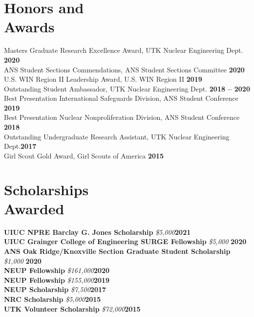 \documentclass[margin,line]{resume}
\begin{document}
\begin{resume}
    \section{\mysidestyle Honors and\\Awards}
                Masters Graduate Research Excellence Award, UTK Nuclear Engineering Dept. \hfill \textbf{2020}\vspace{.5mm}\\%
                ANS Student Sections Commendations, ANS Student Sections Committee \hfill \textbf{2020}\vspace{.5mm}\\%
                U.S. WIN Region II Leadership Award, U.S. WIN Region II \hfill \textbf{2019}\vspace{.5mm}\\%
                Outstanding Student Ambassador, UTK Nuclear Engineering Dept. \hfill \textbf{2018 -- 2020}\vspace{.5mm}\\%
                Best Presentation International Safeguards Division, ANS Student Conference \hfill \textbf{2019}\vspace{0.5mm}\\%
                Best Presentation Nuclear Nonproliferation Division, ANS Student Conference \hfill \textbf{2018}\vspace{0.5mm}\\%
                Outstanding Undergraduate Research Assistant, UTK Nuclear Engineering Dept.\hfill \textbf{2017}\vspace{.5mm}\\%
                Girl Scout Gold Award, Girl Scouts of America \hfill \textbf{2015}\vspace{.5mm}\\%

    \section{\mysidestyle Scholarships\\Awarded}
    \textbf{UIUC NPRE Barclay G. Jones Scholarship} \textsl{\$5,000}\hfill \textbf{2021}\\
    \textbf{UIUC Grainger College of Engineering SURGE Fellowship} \textsl{\$5,000} \hfill \textbf{2020}\\
    \textbf{ANS Oak Ridge/Knoxville Section Graduate Student Scholarship} \textsl{\$1,000} \hfill \textbf{2020}\\
    \textbf{NEUP Fellowship} \textsl{\$161,000}\hfill \textbf{2020}\\
    \textbf{NEUP Fellowship} \textsl{\$155,000}\hfill \textbf{2019}\\
    \textbf{NEUP Scholarship} \textsl{\$7,500}\hfill \textbf{2017}\\
    \textbf{NRC Scholarship} \textsl{\$5,000}\hfill \textbf{2015}\\
    \textbf{UTK Volunteer Scholarship} \textsl{\$72,000}\hfill \textbf{2015}\\


\end{resume}
\end{document}
